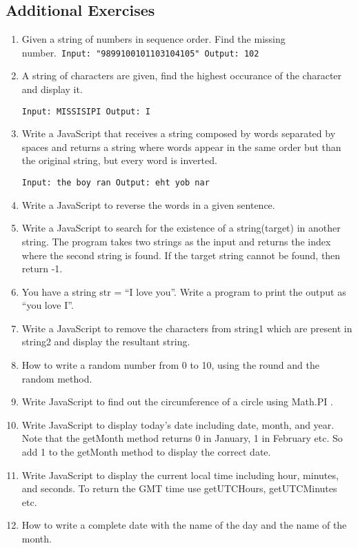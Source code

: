 \documentclass[11pt,a4paper]{article}
\begin{document}
\subsection*{Additional Exercises}
\begin{enumerate}
\item Given a string of numbers in sequence order. Find the missing number.\
\texttt{Input: "9899100101103104105"\newline
        Output: 102}

\item A string of characters are given, find the highest occurance of the character and display it.\

\texttt{Input: MISSISIPI\newline
        Output: I}
\item Write a JavaScript that receives a string composed by words separated by spaces and returns a string where words appear in the same order but than the original string, but every word is inverted.\

\texttt{Input: the boy ran\newline
        Output: eht yob nar}
\item Write a JavaScript to reverse the words in a given sentence.
\item Write a JavaScript to search for the existence of a string(target) in another string. The program takes two strings as the input and returns the index where the second string is found. If the target string cannot be found, then return -1.
\item You have a string str = ``I love you''. Write a program to print the output as ``you love I''.
\item Write a JavaScript to remove the characters from string1 which are present in string2 and display the resultant string.
\item How to write a random number from 0 to 10, using the round and the random method.
\item Write JavaScript to find out the circumference of a circle using Math.PI .
\item Write JavaScript to display today's date including date, month, and year. Note that the getMonth method returns 0 in January, 1 in February etc. So add 1 to the getMonth method to display the correct date.
\item Write JavaScript to display the current local time including hour, minutes, and seconds. To return the GMT time use getUTCHours, getUTCMinutes etc.
\item How to write a complete date with the name of the day and the name of the month.
\end{enumerate}
\end{document}

